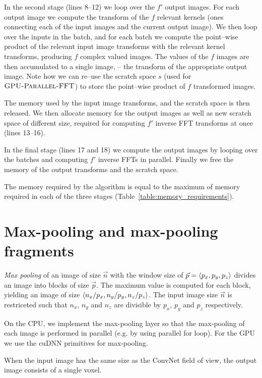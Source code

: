 \documentclass[conference]{./IEEEtran}
\DeclarePairedDelimiter{\angled}{\langle}{\rangle}
\begin{document}
  In the second stage (lines 8--12) we loop over the $f'$ output
  images.  For each output image we compute the transform
  of the $f$ relevant kernels (ones connecting each of the input
  images and the current output image).  We then loop
  over the inputs in the batch, and for each batch we compute the
  point--wise product of the relevant input image transforms with the
  relevant kernel transforms, producing $f$ complex valued images.
  The values of the $f$ images are then accumulated to a single image,
  -- the transform of the appropriate output image.  Note how we can
  re--use the scratch space $s$ (used for $\textnormal{\scshape GPU-Parallel-FFT}$)
  to store the point--wise product of $f$ transformed images.

  The memory used by the input image transforms, and the scratch space
  is then released.  We then allocate memory for the output images as
  well as new scratch space of different size, required for computing
  $f'$ inverse FFT transforms at once (lines 13--16).

  In the final stage (lines 17 and 18) we compute the output images by
  looping over the batches and computing $f'$ inverse FFTs in
  parallel.  Finally we free the memory of the output transforms and
  the scratch space.

  The memory required by the algorithm is equal to the maximum of
  memory required in each of the three stages
  (Table~\ref{table:memory_requirements}).

\section{Max-pooling and max-pooling fragments}

  \emph{Max pooling} of an image of size $\vec{n}$ with the window
  size of $\vec{p} = \angled{p_x,p_y,p_z}$ divides an image into
  blocks of size $\vec{p}$.  The maximum value is computed for each
  block, yielding an image of size $\angled{n_x/p_x,n_y/p_y,n_z/p_z}$.
  The input image size $\vec{n}$ is restriceted such that $n_x$, $n_y$
  and $n_z$ are divisible by $p_x$, $p_y$ and $p_z$ respectively.

  On the CPU, we implement the max-pooling layer so that the
  max-pooling of each image is performed in parallel (e.g. by using
  parallel for loop).  For the GPU we use the cuDNN primitives for
  max-pooling.

  When the input image has the same size as the ConvNet field of view,
  the output image consists of a single voxel.
\end{document}
